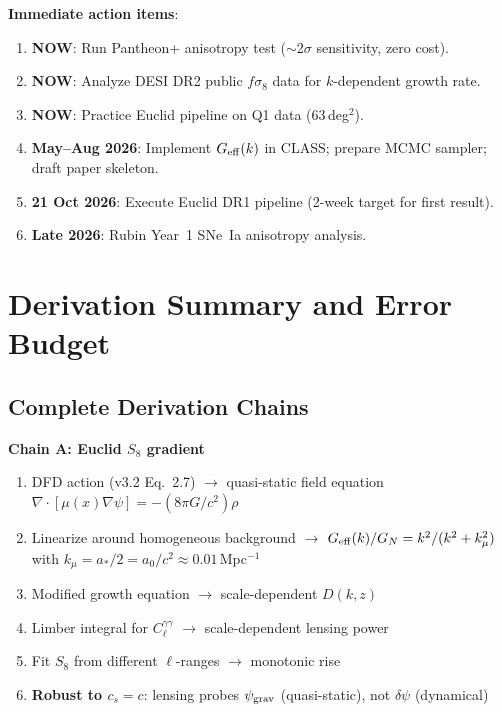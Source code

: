 \documentclass[11pt,a4paper]{article}
\newcommand{\kmu}{k_\mu}
\newcommand{\Geff}{G_{\rm eff}}
\begin{document}
\textbf{Immediate action items}:
\begin{enumerate}[nosep]
\item \textbf{NOW}: Run Pantheon+ anisotropy test ($\sim$2$\sigma$
  sensitivity, zero cost).
\item \textbf{NOW}: Analyze DESI DR2 public $f\sigma_8$ data for
  $k$-dependent growth rate.
\item \textbf{NOW}: Practice Euclid pipeline on Q1 data (63\,deg$^2$).
\item \textbf{May--Aug 2026}: Implement $\Geff(k)$ in CLASS; prepare
  MCMC sampler; draft paper skeleton.
\item \textbf{21 Oct 2026}: Execute Euclid DR1 pipeline (2-week target
  for first result).
\item \textbf{Late 2026}: Rubin Year~1 SNe~Ia anisotropy analysis.
\end{enumerate}


\section{Derivation Summary and Error Budget}
\label{sec:derivations}

\subsection{Complete Derivation Chains}

\textbf{Chain A: Euclid $S_8$ gradient}
\begin{enumerate}[nosep]
\item DFD action (v3.2 Eq.~2.7) $\to$ quasi-static field equation
  $\nabla\cdot[\mu(x)\nabla\psi] = -(8\pi G/c^2)\rho$
\item Linearize around homogeneous background $\to$
  $\Geff(k)/G_N = k^2/(k^2 + \kmu^2)$ with $\kmu = a_*/2 = a_0/c^2
  \approx 0.01$\,Mpc$^{-1}$
\item Modified growth equation $\to$ scale-dependent $D(k,z)$
\item Limber integral for $C_\ell^{\gamma\gamma}$ $\to$
  scale-dependent lensing power
\item Fit $S_8$ from different $\ell$-ranges $\to$ monotonic rise
\item \textbf{Robust to $c_s = c$}: lensing probes $\psi_{\rm grav}$
  (quasi-static), not $\delta\psi$ (dynamical)
\end{enumerate}
\end{document}
